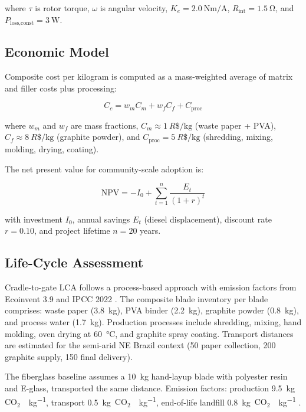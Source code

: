 \documentclass[twocolumn]{article}
\newcommand{\BrazilianReal}{R\$}
\newcommand{\COtwo}{\ensuremath{\mathrm{CO_2}}\xspace}
\newcommand{\COtwoe}{\COtwo\mathrm{e}\xspace}
\begin{document}
where $\tau$ is rotor torque, $\omega$ is angular velocity, $K_e = \SI{2.0}{\newton\meter\per\ampere}$, $R_{\text{int}} = \SI{1.5}{\ohm}$, and $P_{\text{loss,const}} = \SI{3}{\watt}$.

\subsection{Economic Model}

Composite cost per kilogram is computed as a mass-weighted average of matrix and filler costs plus processing:

\begin{equation}
C_c = w_m C_m + w_f C_f + C_{\text{proc}}
\end{equation}

where $w_m$ and $w_f$ are mass fractions, $C_m \approx \SI{1}{\BrazilianReal\per\kilogram}$ (waste paper + PVA), $C_f \approx \SI{8}{\BrazilianReal\per\kilogram}$ (graphite powder), and $C_{\text{proc}} = \SI{5}{\BrazilianReal\per\kilogram}$ (shredding, mixing, molding, drying, coating).

The net present value for community-scale adoption is:

\begin{equation}
\text{NPV} = -I_0 + \sum_{t=1}^{n} \frac{E_t}{(1 + r)^t}
\end{equation}

with investment $I_0$, annual savings $E_t$ (diesel displacement), discount rate $r = 0.10$, and project lifetime $n = 20$ years.

\subsection{Life-Cycle Assessment}

Cradle-to-gate LCA follows a process-based approach with emission factors from Ecoinvent 3.9 \cite{ecoinvent2022} and IPCC 2022 \cite{ipcc2022}. The composite blade inventory per blade comprises: waste paper (\SI{3.8}{\kilogram}), PVA binder (\SI{2.2}{\kilogram}), graphite powder (\SI{0.8}{\kilogram}), and process water (\SI{1.7}{\kilogram}). Production processes include shredding, mixing, hand molding, oven drying at \SI{60}{\celsius}, and graphite spray coating. Transport distances are estimated for the semi-arid NE Brazil context (\SI{50}{\kilometer} paper collection, \SI{200}{\kilometer} graphite supply, \SI{150}{\kilometer} final delivery).

The fiberglass baseline assumes a \SI{10}{\kilogram} hand-layup blade with polyester resin and E-glass, transported the same distance. Emission factors: production \SI{9.5}{\kilogram\COtwoe\per\kilogram}, transport \SI{0.5}{\kilogram\COtwoe\per\kilogram}, end-of-life landfill \SI{0.8}{\kilogram\COtwoe\per\kilogram} \cite{liu2022}.
\end{document}
